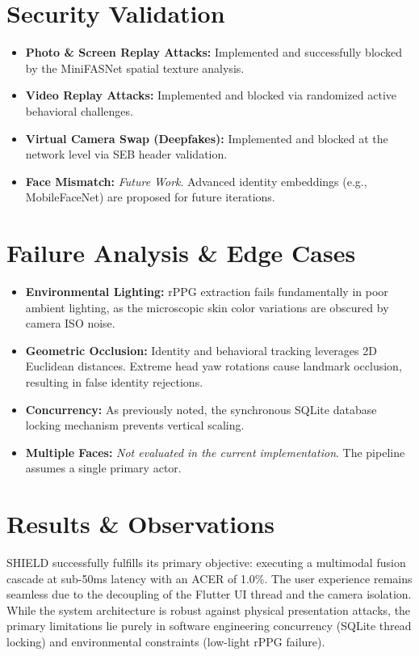 \section{Security Validation}
\begin{itemize}
    \item \textbf{Photo \& Screen Replay Attacks:} Implemented and successfully blocked by the MiniFASNet spatial texture analysis.
    \item \textbf{Video Replay Attacks:} Implemented and blocked via randomized active behavioral challenges.
    \item \textbf{Virtual Camera Swap (Deepfakes):} Implemented and blocked at the network level via SEB header validation.
    \item \textbf{Face Mismatch:} \textit{Future Work}. Advanced identity embeddings (e.g., MobileFaceNet) are proposed for future iterations.
\end{itemize}

\section{Failure Analysis \& Edge Cases}
\begin{itemize}
    \item \textbf{Environmental Lighting:} rPPG extraction fails fundamentally in poor ambient lighting, as the microscopic skin color variations are obscured by camera ISO noise.
    \item \textbf{Geometric Occlusion:} Identity and behavioral tracking leverages 2D Euclidean distances. Extreme head yaw rotations cause landmark occlusion, resulting in false identity rejections.
    \item \textbf{Concurrency:} As previously noted, the synchronous SQLite database locking mechanism prevents vertical scaling.
    \item \textbf{Multiple Faces:} \textit{Not evaluated in the current implementation}. The pipeline assumes a single primary actor.
\end{itemize}

\section{Results \& Observations}
SHIELD successfully fulfills its primary objective: executing a multimodal fusion cascade at sub-50ms latency with an ACER of 1.0\%. The user experience remains seamless due to the decoupling of the Flutter UI thread and the camera isolation. While the system architecture is robust against physical presentation attacks, the primary limitations lie purely in software engineering concurrency (SQLite thread locking) and environmental constraints (low-light rPPG failure).

